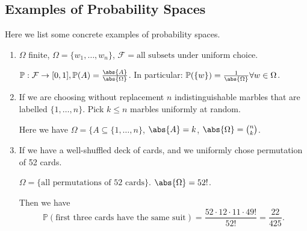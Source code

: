 \subsection{Examples of Probability Spaces}
\begin{example}
    Here we list some concrete examples of probability spaces.
    \begin{enumerate}
\item \(\Omega\) finite, \(\Omega = \{w_1, \ldots , w_n \}\), \(\mathcal{F} = \text{all subsets under uniform choice}\).

\(\mathbb{P}:\mathcal{F} \to [0,1], \mathbb{P}(A) = \frac{\abs{A} }{\abs{\Omega} }\).
In particular: \(\mathbb{P}(\{w\}) = \frac{1}{\abs{\Omega}} \forall w \in \Omega\).

\item If we are choosing without replacement
\(n\) indistinguishable marbles that are labelled \(\{1, \ldots, n \}\). Pick \(k \leq n\) marbles uniformly at random.

Here we have \(\Omega=\{A \subseteq \{1, \ldots , n \}\), \(\abs{A} = k\), \(\abs{\Omega} = \binom{n}{k}\).

\item If we have a well-shuffled deck of cards, and we uniformly chose permutation of 52 cards.

\(\Omega = \{\text{all permutations of 52 cards}\}\). \(\abs{\Omega} = 52!\).

Then we have
\[
    \mathbb{P}(\text{first three cards have the same suit}) = \frac{52 \cdot 12 \cdot 11 \cdot 49!}{52!} = \frac{22}{425}.
\]
    \end{enumerate}
\end{example}